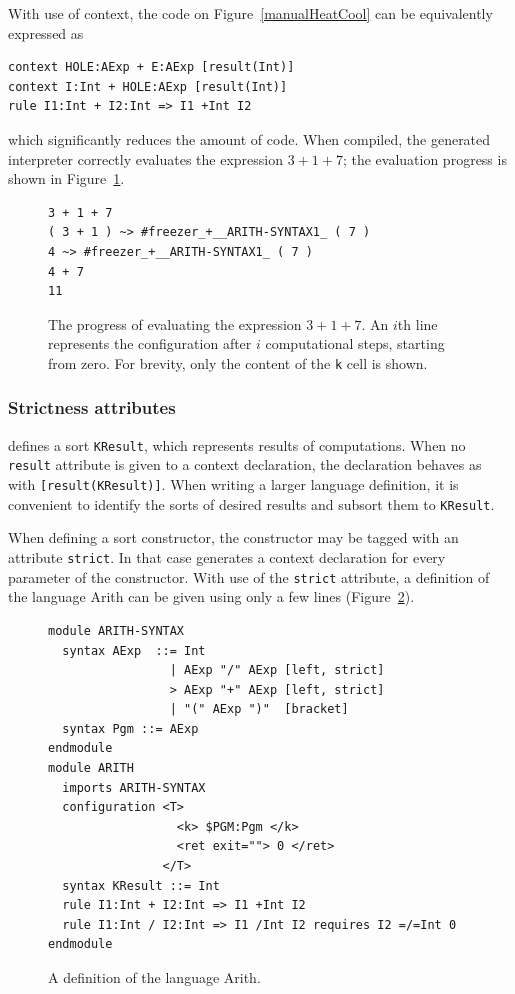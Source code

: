 \documentclass{fithesis3}
\begin{document}
With use of context, the code on Figure~\ref{manualHeatCool} can be equivalently expressed as
\begin{lstlisting}
context HOLE:AExp + E:AExp [result(Int)]
context I:Int + HOLE:AExp [result(Int)]
rule I1:Int + I2:Int => I1 +Int I2
\end{lstlisting}
which significantly reduces the amount of code. When compiled, the generated interpreter correctly evaluates the expression $3 + 1 + 7$; the evaluation progress is shown in Figure~\ref{contextEvaluation}.

\begin{figure}
\begin{lstlisting}
3 + 1 + 7
( 3 + 1 ) ~> #freezer_+__ARITH-SYNTAX1_ ( 7 )
4 ~> #freezer_+__ARITH-SYNTAX1_ ( 7 )
4 + 7
11
\end{lstlisting}
\caption{The progress of evaluating the expression $3 + 1 + 7$. An $i$th line represents the configuration after $i$ computational steps, starting from zero. For brevity, only the content of the \texttt{k} cell is shown.}
\label{contextEvaluation}
\end{figure}

\subsubsection{Strictness attributes}
\K defines a sort \texttt{KResult}, which represents results of computations. When no \texttt{result} attribute is given to a context declaration, the declaration behaves as with \lstinline{[result(KResult)]}{}. When writing a larger language definition, it is convenient to identify the sorts of desired results and subsort them to \texttt{KResult}.

When defining a sort constructor, the constructor may be tagged with an attribute \texttt{strict}. In that case \K generates a context declaration for every parameter of the constructor. With use of the \texttt{strict} attribute, a definition of the language Arith can be given using only a few lines (Figure~\ref{arithFinal}).

\begin{figure}
\begin{lstlisting}
module ARITH-SYNTAX
  syntax AExp  ::= Int
                 | AExp "/" AExp [left, strict]
                 > AExp "+" AExp [left, strict]
                 | "(" AExp ")"  [bracket]
  syntax Pgm ::= AExp
endmodule
module ARITH
  imports ARITH-SYNTAX
  configuration <T>
                  <k> $PGM:Pgm </k>
                  <ret exit=""> 0 </ret>
                </T>
  syntax KResult ::= Int
  rule I1:Int + I2:Int => I1 +Int I2
  rule I1:Int / I2:Int => I1 /Int I2 requires I2 =/=Int 0
endmodule
\end{lstlisting}
\caption{A definition of the language Arith.}
\label{arithFinal}
\end{figure}
\end{document}
